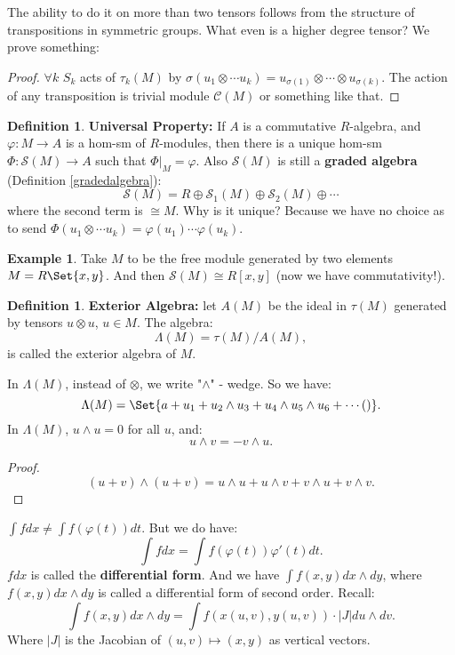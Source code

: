 \documentclass[9pt,reqno,twoside]{amsbook}
\theoremstyle{plain}
\numberwithin{section}{chapter}
\numberwithin{equation}{chapter}
\theoremstyle{definition}
\newtheorem{Def}[theorem]{Definition}
\newtheorem{Ex}[theorem]{Example}
\theoremstyle{remark}
\theoremstyle{plain}
\newcommand{\tens}{\otimes}
\renewcommand{\phi}{\varphi}
\begin{document}
The ability to do it on more than two tensors follows from the structure of transpositions in symmetric groups. What even is a higher degree tensor? We prove something:
\begin{proof} 
$\forall k$ $S_k$ acts of $\tau_k(M)$ by $\sigma(u_1 \tens \cdots u_k) = u_{\sigma(1)} \tens \cdots \tens u_{\sigma(k)}$. The action of any transposition is trivial module $\mathcal{C}(M)$ or something like that. 
\end{proof}

\begin{Def}
\textbf{Universal Property: }If $A$ is a commutative $R$-algebra, and $\phi:M \to A$ is a hom-sm of $R$-modules, then there is a unique hom-sm $\Phi:\mathcal{S}(M) \to A$ such that $\Phi|_{M} = \phi$. Also $\mathcal{S}(M)$ is still a \textbf{graded algebra} (Definition \ref{gradedalgebra}):
$$
\mathcal{S}(M) = R \oplus \mathcal{S}_1(M) \oplus \mathcal{S}_2(M) \oplus \cdots
$$
where the second term is $\cong M$. Why is it unique? Because we have no choice as to send $\Phi(u_1 \tens \cdots u_k) = \phi(u_1) \cdots \phi(u_k)$. 
\end{Def}

\begin{Ex}
Take $M$ to be the free module generated by two elements $M = R\Set{x,y}$. And then $\mathcal{S}(M) \cong R[x,y]$ (now we have commutativity!).
\end{Ex}

\begin{Def}
\textbf{Exterior Algebra: }let $A(M)$ be the ideal in $\tau(M)$ generated by tensors $u \tens u$, $u \in M$. The algebra:
$$
\Lambda(M) = \tau(M)/A(M),
$$
is called the exterior algebra of $M$. 
\end{Def}

In $\Lambda(M)$, instead of $\tens$, we write "$\wedge$" - wedge. So we have:
$$
\Lambda(M) = \Set{a + u_1 + u_2 \wedge u_3 + u_4 \wedge u_5 \wedge u_6 + \cdots ()}.
$$
In $\Lambda(M)$, $u \wedge u = 0$ for all $u$, and:
$$
u \wedge v = -v \wedge u.
$$
\begin{proof} 
$$
(u + v) \wedge (u + v) = u \wedge u + u \wedge v + v \wedge u + v \wedge v.
$$
\end{proof}

$ \int fdx \neq \int f(\phi(t))dt$. But we do have:
$$
\int fdx = \int f(\phi(t))\phi'(t) dt.
$$
$fdx$ is called the \textbf{differential form}. And we have $\int f(x,y)dx \wedge dy$, where $f(x,y)dx \wedge dy$ is called a differential form of second order. Recall: 
$$
\int f(x,y)dx \wedge dy = \int f(x(u,v),y(u,v))\cdot |J|du\wedge dv.
$$
Where $|J|$ is the Jacobian of $(u,v) \mapsto (x,y)$ as vertical vectors. 
\end{document}
